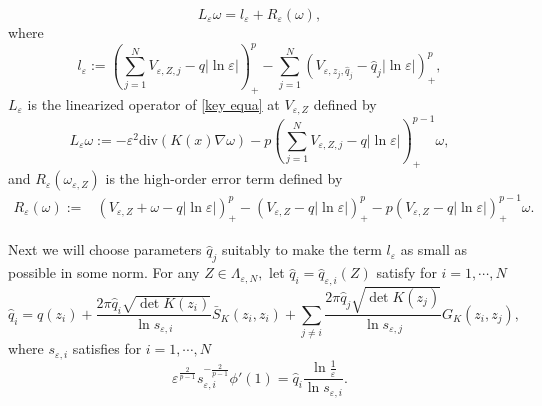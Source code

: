 \documentclass[12pt,reqno]{amsart}
\numberwithin{equation}{section}
\theoremstyle{definition}
\theoremstyle{remark}
\begin{document}
\begin{equation}\label{3-03}
L_\varepsilon \omega=l_\varepsilon+ R_\varepsilon(\omega),
\end{equation}
where
\begin{equation*}
l_\varepsilon:=\left (\sum_{j=1}^NV_{\varepsilon, Z,j}-q|\ln\varepsilon|\right )^{p}_+-\sum_{j=1}^N\left (V_{\varepsilon, z_j, \hat{q}_j}-\hat{q}_j|\ln\varepsilon|\right )^{p}_+,
\end{equation*}
$ L_\varepsilon $ is the linearized operator of \eqref{key equa} at $  V_{\varepsilon, Z} $ defined by
\begin{equation*}
L_\varepsilon \omega:=-\varepsilon^2\text{div}(K(x)\nabla \omega)- p\left (\sum_{j=1}^NV_{\varepsilon, Z,j}-q|\ln\varepsilon|\right )^{p-1}_+\omega,
\end{equation*}
and $ R_\varepsilon(\omega_{\varepsilon,Z}) $ is the high-order error term defined by
\begin{equation*}
\begin{split}
R_\varepsilon(\omega):=&\left (V_{\varepsilon, Z}+\omega-q|\ln\varepsilon|\right )^{p}_+-\left (V_{\varepsilon, Z}-q|\ln\varepsilon|\right )^{p}_+-p\left (V_{\varepsilon, Z}-q|\ln\varepsilon|\right )^{p-1}_+\omega.
\end{split}
\end{equation*}



Next we will choose parameters $ \hat{q}_j $ suitably to make the term $ l_\varepsilon $ as small as possible in some norm. For any $ Z\in \Lambda_{\varepsilon, N}, $ let $ \hat{q}_i=\hat{q}_{\varepsilon,i}(Z) $   satisfy for $ i=1,\cdots,N $
\begin{equation}\label{q_i choice}
\hat{q}_i=q(z_i)+\frac{2\pi\hat{q}_i\sqrt{\det K(z_i)}}{\ln s_{\varepsilon,i}}\bar{S}_K(z_i, z_i)+\sum_{j\neq i}\frac{2\pi\hat{q}_j\sqrt{\det K(z_j)}}{\ln s_{\varepsilon,j}}G_K(z_i, z_j),
\end{equation}
where $ s_{\varepsilon,i} $ satisfies for $ i=1,\cdots,N $
\begin{equation*}
\varepsilon^{\frac{2}{p-1}}s_{\varepsilon,i}^{-\frac{2}{p-1}}\phi'(1)=\hat{q}_i\frac{ \ln\frac{1}{\varepsilon}}{\ln s_{\varepsilon,i}}.
\end{equation*}
\end{document}
